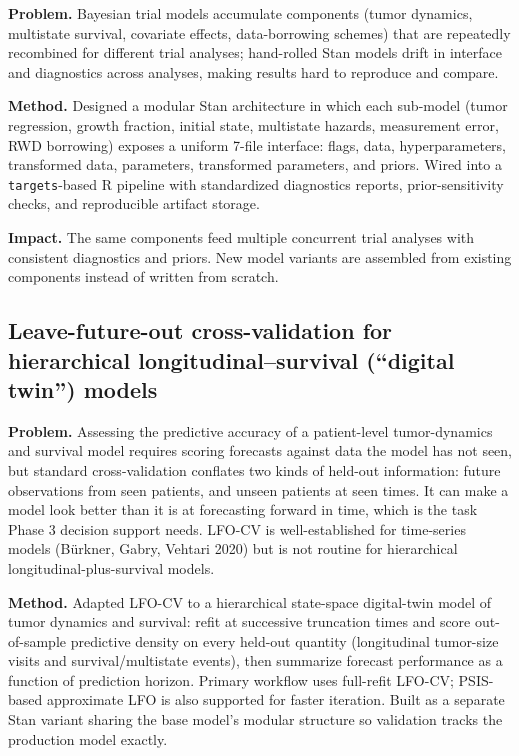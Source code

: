 \documentclass[11pt]{article}
\begin{document}
\textbf{Problem.} Bayesian trial models accumulate components (tumor dynamics, multistate survival, covariate effects, data-borrowing schemes) that are repeatedly recombined for different trial analyses; hand-rolled Stan models drift in interface and diagnostics across analyses, making results hard to reproduce and compare.

\textbf{Method.} Designed a modular Stan architecture in which each sub-model (tumor regression, growth fraction, initial state, multistate hazards, measurement error, RWD borrowing) exposes a uniform 7-file interface: flags, data, hyperparameters, transformed data, parameters, transformed parameters, and priors. Wired into a \texttt{targets}-based R pipeline with standardized diagnostics reports, prior-sensitivity checks, and reproducible artifact storage.

\textbf{Impact.} The same components feed multiple concurrent trial analyses with consistent diagnostics and priors. New model variants are assembled from existing components instead of written from scratch.

\subsection*{Leave-future-out cross-validation for hierarchical longitudinal--survival (``digital twin'') models}

\textbf{Problem.} Assessing the predictive accuracy of a patient-level tumor-dynamics and survival model requires scoring forecasts against data the model has not seen, but standard cross-validation conflates two kinds of held-out information: future observations from seen patients, and unseen patients at seen times. It can make a model look better than it is at forecasting forward in time, which is the task Phase 3 decision support needs. LFO-CV is well-established for time-series models (B\"{u}rkner, Gabry, Vehtari 2020) but is not routine for hierarchical longitudinal-plus-survival models.

\textbf{Method.} Adapted LFO-CV to a hierarchical state-space digital-twin model of tumor dynamics and survival: refit at successive truncation times and score out-of-sample predictive density on every held-out quantity (longitudinal tumor-size visits and survival/multistate events), then summarize forecast performance as a function of prediction horizon. Primary workflow uses full-refit LFO-CV; PSIS-based approximate LFO is also supported for faster iteration. Built as a separate Stan variant sharing the base model's modular structure so validation tracks the production model exactly.
\end{document}

